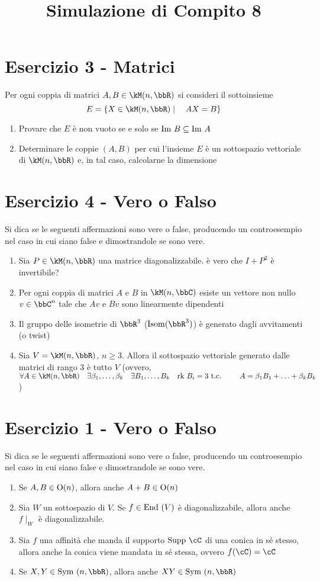 \documentclass[a4paper,NoNotes,GeneralMath]{stdmdoc}
\begin{document}
	\section*{Esercizio 3 - Matrici}
	Per ogni coppia di matrici $A, B \in \kM(n, \bbR)$ si consideri il sottoinsieme $$ E = \{ X \in \kM(n,\bbR) \mid \quad AX = B \} $$
	\begin{enumerate}
		\item Provare che $E$ è non vuoto se e solo se $\mbox{Im } B \subseteq \mbox{Im } A$
		\item Determinare le coppie $(A, B)$ per cui l'insieme $E$ è un sottospazio vettoriale di $\kM(n, \bbR)$ e, in tal caso, calcolarne la dimensione
	\end{enumerate}

	\section*{Esercizio 4 - Vero o Falso}
	Si dica se le seguenti affermazioni sono vere o false, producendo un controesempio nel caso in cui siano false e dimostrandole se sono vere.
	\begin{enumerate}
		\item Sia $P \in \kM(n,\bbR)$ una matrice diagonalizzabile. è vero che $I + P^2$ è invertibile?
		\item Per ogni coppia di matrici $A$ e $B$ in $\kM(n, \bbC)$ esiste un vettore non nullo $v \in \bbC^n$ tale che $Av$ e $Bv$ sono linearmente dipendenti
		\item Il gruppo delle isometrie di $\bbR^3$ ($\Isom(\bbR^3)$) è generato dagli avvitamenti (o twist)
		\item Sia $V = \kM(n, \bbR)$, $n \ge 3$. Allora il sottospazio vettoriale generato dalle matrici di rango $3$ è tutto $V$ (ovvero, $\forall A \in \kM(n,\bbR) \quad \exists \beta_1, \ldots, \beta_k \quad \exists B_1, \ldots, B_k \quad \Rk B_i = 3 \tc \qquad A = \beta_1 B_1 + \ldots + \beta_k B_k$)
	\end{enumerate}

	\newpage
	\title{Simulazione di Compito 8}
	\section*{Esercizio 1 - Vero o Falso}
	Si dica se le seguenti affermazioni sono vere o false, producendo un controesempio nel caso in cui siano false e dimostrandole se sono vere.
	\begin{enumerate}
		\item Se $A, B \in \mbox{O}(n)$, allora anche $A + B \in \mbox{O}(n)$
		\item Sia $W$ un sottospazio di $V$. Se $f \in \mbox{End }(V)$ è diagonalizzabile, allora anche $f\mid_W$ è diagonalizzabile.
		\item Sia $f$ una affinità che manda il supporto $\Supp \cC$ di una conica in sé stesso, allora anche la conica viene mandata in sé stessa, ovvero $f(\cC) = \cC$
		\item Se $X, Y \in \Symm(n, \bbR)$, allora anche $XY \in \Symm(n, \bbR)$
	\end{enumerate}
\end{document}
